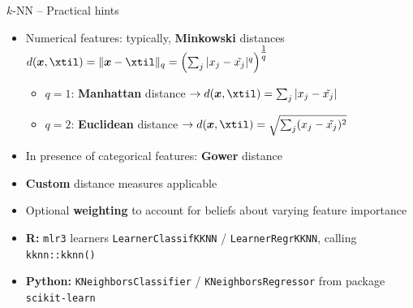 \begin{frame}{$k$-NN -- Practical hints}


\begin{itemize}
  \item Numerical features: typically, \textbf{Minkowski} distances
  $d(\xv, \xtil) = \|\xv - \xtil \|_q = 
  \left( \sum_j | x_j - \tilde{x_j} |^q
  \right)^{\tfrac{1}{q}}$
  \begin{itemize}
    \item $q = 1$: \textbf{Manhattan} distance $\rightarrow d(\xv, \xtil) =
    \sum_j | x_j - \tilde{x_j} |$
  \item $q = 2$: \textbf{Euclidean} distance $\rightarrow d(\xv, \xtil) =
  \sqrt{\sum_j (x_j - \tilde{x_j})^2}$
  \end{itemize}
  \item In presence of categorical features: \textbf{Gower} distance
  \item \textbf{Custom} distance measures applicable
  \item Optional \textbf{weighting} to account for beliefs about varying feature
  importance
\end{itemize}

\medskip

\begin{itemize}
  \item \textbf{R:} \texttt{mlr3} learners \texttt{LearnerClassifKKNN} /
  \texttt{LearnerRegrKKNN}, calling \texttt{kknn::kknn()}
  \item \textbf{Python:} \texttt{KNeighborsClassifier} / 
  \texttt{KNeighborsRegressor} from package \texttt{scikit-learn}
\end{itemize}

\end{frame}